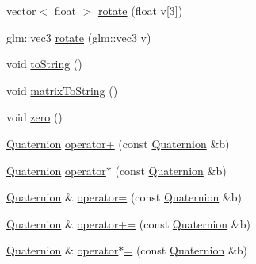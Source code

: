 \begin{DoxyCompactItemize}
\item 
vector$<$ float $>$ \hyperlink{classQuaternion_a341d532ec38393c75673d1b3a3ec9e2f}{rotate} (float v\mbox{[}3\mbox{]})
\item 
glm\-::vec3 \hyperlink{classQuaternion_a96d763a210463981dc621b0bf8a84259}{rotate} (glm\-::vec3 v)
\item 
void \hyperlink{classQuaternion_aa3bbfe668e104769f47344dc6e63eb5b}{to\-String} ()
\item 
void \hyperlink{classQuaternion_a0bf91c04839f665014253c74a0461461}{matrix\-To\-String} ()
\item 
void \hyperlink{classQuaternion_a5be74768bcc366ea59a9c6adffdcdd4e}{zero} ()
\item 
\hyperlink{classQuaternion}{Quaternion} \hyperlink{classQuaternion_a8ab54a1bd23bcbb4476c831f7c0068a2}{operator+} (const \hyperlink{classQuaternion}{Quaternion} \&b)
\item 
\hyperlink{classQuaternion}{Quaternion} \hyperlink{classQuaternion_af29f524832881bd5d63d5ab91d45f4ec}{operator$\ast$} (const \hyperlink{classQuaternion}{Quaternion} \&b)
\item 
\hyperlink{classQuaternion}{Quaternion} \& \hyperlink{classQuaternion_a3641a98c644ddeea289c8c2346b46e24}{operator=} (const \hyperlink{classQuaternion}{Quaternion} \&b)
\item 
\hyperlink{classQuaternion}{Quaternion} \& \hyperlink{classQuaternion_ab0cb54aa37454407567633657a77a9e3}{operator+=} (const \hyperlink{classQuaternion}{Quaternion} \&b)
\item 
\hyperlink{classQuaternion}{Quaternion} \& \hyperlink{classQuaternion_acb888d289a05c63403790685c10dde1a}{operator$\ast$=} (const \hyperlink{classQuaternion}{Quaternion} \&b)
\end{DoxyCompactItemize}


